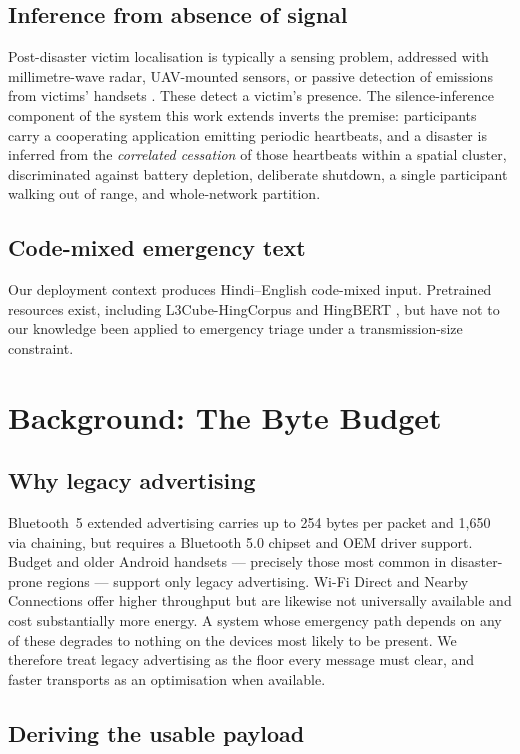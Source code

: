 \documentclass[conference]{IEEEtran}
\begin{document}
\subsection{Inference from absence of signal}
Post-disaster victim localisation is typically a sensing problem, addressed
with millimetre-wave radar, UAV-mounted sensors, or passive detection of
emissions from victims' handsets \cite{victim}. These detect a victim's
presence. The silence-inference component of the system this work extends
inverts the premise: participants carry a cooperating application emitting
periodic heartbeats, and a disaster is inferred from the \emph{correlated
cessation} of those heartbeats within a spatial cluster, discriminated against
battery depletion, deliberate shutdown, a single participant walking out of
range, and whole-network partition.

\subsection{Code-mixed emergency text}
Our deployment context produces Hindi--English code-mixed input. Pretrained
resources exist, including L3Cube-HingCorpus and HingBERT \cite{hingbert}, but
have not to our knowledge been applied to emergency triage under a
transmission-size constraint.

\section{Background: The Byte Budget}

\subsection{Why legacy advertising}
Bluetooth~5 extended advertising carries up to 254 bytes per packet and 1{,}650
via chaining, but requires a Bluetooth 5.0 chipset and OEM driver support.
Budget and older Android handsets --- precisely those most common in
disaster-prone regions --- support only legacy advertising. Wi-Fi Direct and
Nearby Connections offer higher throughput but are likewise not universally
available and cost substantially more energy. A system whose emergency path
depends on any of these degrades to nothing on the devices most likely to be
present. We therefore treat legacy advertising as the floor every message must
clear, and faster transports as an optimisation when available.

\subsection{Deriving the usable payload}
\end{document}
